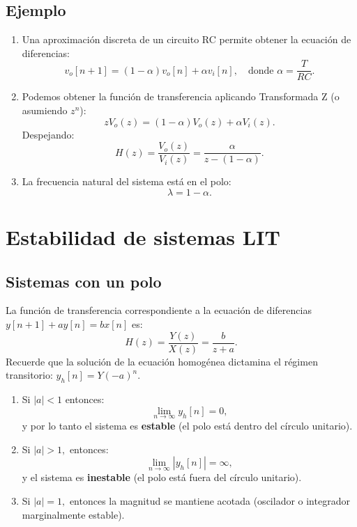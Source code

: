 \subsection{Ejemplo}
\begin{enumerate}
	\item Una aproximaci\'{o}n discreta de un circuito RC permite obtener la ecuaci\'{o}n de diferencias:
	\begin{equation}
		v_o[n+1] = (1-\alpha) v_o[n] + \alpha v_i[n], \quad \text{donde } \alpha = \frac{T}{RC}.
	\end{equation}
	
	\item Podemos obtener la funci\'{o}n de transferencia aplicando Transformada Z (o asumiendo $z^n$):
	\begin{equation}
		z V_o(z) = (1-\alpha) V_o(z) + \alpha V_i(z).
	\end{equation}
	Despejando:
	\begin{equation}
		H(z) = \frac{V_o(z)}{V_i(z)} = \frac{\alpha}{z - (1-\alpha)}.
	\end{equation}
	
	\item La frecuencia natural del sistema está en el polo:
	\begin{equation}
		\lambda = 1-\alpha.
	\end{equation}
\end{enumerate}

\section{Estabilidad de sistemas LIT}

\subsection{Sistemas con un polo}

La funci\'{o}n de transferencia correspondiente a la ecuaci\'{o}n de diferencias $y[n+1] + ay[n] = bx[n]$ es:
\begin{equation}
	H(z) = \frac{Y(z)}{X(z)} = \frac{b}{z+a}.
\end{equation}
Recuerde que la soluci\'{o}n de la ecuaci\'{o}n homog\'{e}nea dictamina el régimen transitorio: $y_h[n] = Y(-a)^n$.

\begin{enumerate}
	\item Si $|a| < 1$ entonces:
	\begin{equation}
		\lim_{n \to \infty} y_h[n] = 0,
	\end{equation}
	y por lo tanto el sistema es \textbf{estable} (el polo está dentro del círculo unitario).
	
	\item Si $|a| > 1,$ entonces:
	\begin{equation}
		\lim_{n \to \infty} |y_h[n]| = \infty,
	\end{equation}
	y el sistema es \textbf{inestable} (el polo está fuera del círculo unitario).
	
	\item Si $|a| = 1,$ entonces la magnitud se mantiene acotada (oscilador o integrador marginalmente estable).
\end{enumerate}

